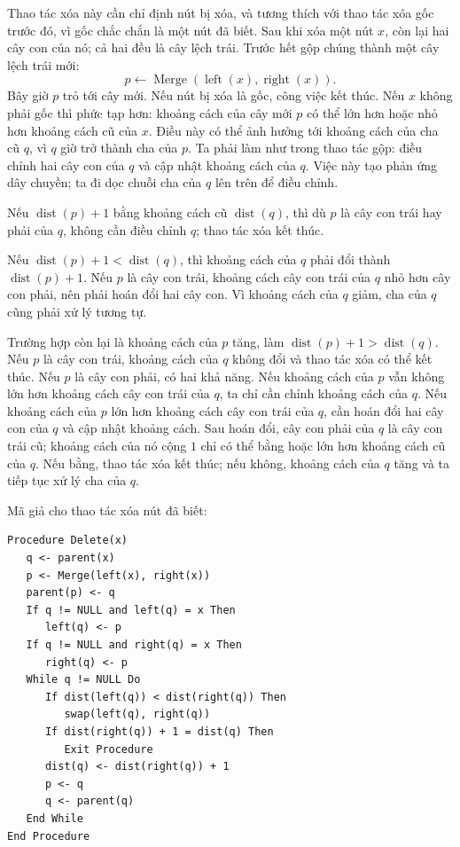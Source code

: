 \documentclass[11pt]{article}
\begin{document}
Thao tác xóa này cần chỉ định nút bị xóa, và tương thích với thao tác xóa gốc
trước đó, vì gốc chắc chắn là một nút đã biết. Sau khi xóa một nút \(x\), còn
lại hai cây con của nó; cả hai đều là cây lệch trái. Trước hết gộp chúng thành
một cây lệch trái mới:
\[
  p \gets \operatorname{Merge}(\operatorname{left}(x),\operatorname{right}(x)).
\]
Bây giờ \(p\) trỏ tới cây mới. Nếu nút bị xóa là gốc, công việc kết thúc. Nếu
\(x\) không phải gốc thì phức tạp hơn: khoảng cách của cây mới \(p\) có thể lớn
hơn hoặc nhỏ hơn khoảng cách cũ của \(x\). Điều này có thể ảnh hưởng tới khoảng
cách của cha cũ \(q\), vì \(q\) giờ trở thành cha của \(p\). Ta phải làm như
trong thao tác gộp: điều chỉnh hai cây con của \(q\) và cập nhật khoảng cách
của \(q\). Việc này tạo phản ứng dây chuyền; ta đi dọc chuỗi cha của \(q\) lên
trên để điều chỉnh.

Nếu \(\operatorname{dist}(p)+1\) bằng khoảng cách cũ \(\operatorname{dist}(q)\),
thì dù \(p\) là cây con trái hay phải của \(q\), không cần điều chỉnh \(q\);
thao tác xóa kết thúc.

Nếu \(\operatorname{dist}(p)+1<\operatorname{dist}(q)\), thì khoảng cách của
\(q\) phải đổi thành \(\operatorname{dist}(p)+1\). Nếu \(p\) là cây con trái,
khoảng cách cây con trái của \(q\) nhỏ hơn cây con phải, nên phải hoán đổi hai
cây con. Vì khoảng cách của \(q\) giảm, cha của \(q\) cũng phải xử lý tương tự.

Trường hợp còn lại là khoảng cách của \(p\) tăng, làm
\(\operatorname{dist}(p)+1>\operatorname{dist}(q)\). Nếu \(p\) là cây con trái,
khoảng cách của \(q\) không đổi và thao tác xóa có thể kết thúc. Nếu \(p\) là
cây con phải, có hai khả năng. Nếu khoảng cách của \(p\) vẫn không lớn hơn
khoảng cách cây con trái của \(q\), ta chỉ cần chỉnh khoảng cách của \(q\). Nếu
khoảng cách của \(p\) lớn hơn khoảng cách cây con trái của \(q\), cần hoán đổi
hai cây con của \(q\) và cập nhật khoảng cách. Sau hoán đổi, cây con phải của
\(q\) là cây con trái cũ; khoảng cách của nó cộng \(1\) chỉ có thể bằng hoặc lớn
hơn khoảng cách cũ của \(q\). Nếu bằng, thao tác xóa kết thúc; nếu không, khoảng
cách của \(q\) tăng và ta tiếp tục xử lý cha của \(q\).

Mã giả cho thao tác xóa nút đã biết:

\begin{verbatim}
Procedure Delete(x)
   q <- parent(x)
   p <- Merge(left(x), right(x))
   parent(p) <- q
   If q != NULL and left(q) = x Then
      left(q) <- p
   If q != NULL and right(q) = x Then
      right(q) <- p
   While q != NULL Do
      If dist(left(q)) < dist(right(q)) Then
         swap(left(q), right(q))
      If dist(right(q)) + 1 = dist(q) Then
         Exit Procedure
      dist(q) <- dist(right(q)) + 1
      p <- q
      q <- parent(q)
   End While
End Procedure
\end{verbatim}
\end{document}
